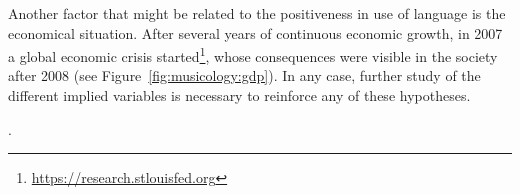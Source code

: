 Another factor that might be related to the positiveness in use of language is the economical situation. After several years of continuous economic growth, in 2007 a global economic crisis started\footnote{\url{https://research.stlouisfed.org}}, whose consequences were visible in the society after 2008 (see Figure~\ref{fig:musicology:gdp}). In any case, further study of the different implied variables is necessary to reinforce any of these hypotheses.


. 
    




